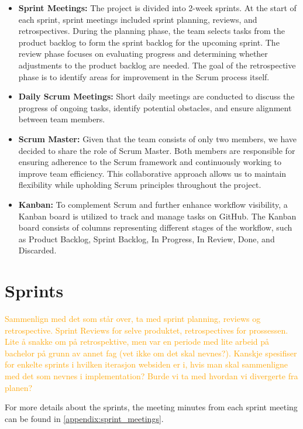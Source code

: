 \begin{itemize}
    \item \textbf{Sprint Meetings:} The project is divided into 2-week sprints. At the start of each sprint, sprint meetings included sprint planning, reviews, and retrospectives. During the planning phase, the team selects tasks from the product backlog to form the sprint backlog for the upcoming sprint. The review phase focuses on evaluating progress and determining whether adjustments to the product backlog are needed. The goal of the retrospective phase is to identify areas for improvement in the Scrum process itself.
    \item \textbf{Daily Scrum Meetings:} Short daily meetings are conducted to discuss the progress of ongoing tasks, identify potential obstacles, and ensure alignment between team members. 
    \item \textbf{Scrum Master:} Given that the team consists of only two members, we have decided to share the role of Scrum Master. Both members are responsible for ensuring adherence to the Scrum framework and continuously working to improve team efficiency. This collaborative approach allows us to maintain flexibility while upholding Scrum principles throughout the project.
    \item \textbf{Kanban:} To complement Scrum and further enhance workflow visibility, a Kanban board is utilized to track and manage tasks on GitHub. The Kanban board consists of columns representing different stages of the workflow, such as Product Backlog, Sprint Backlog, In Progress, In Review, Done, and Discarded.
\end{itemize}

\section{Sprints}

\textcolor{orange}{Sammenlign med det som står over, ta med sprint planning, reviews og retrospective. Sprint Reviews for selve produktet, retrospectives for prossessen. Lite å snakke om på retrospektive, men var en periode med lite arbeid på bachelor på grunn av annet fag (vet ikke om det skal nevnes?). Kanskje spesifiser for enkelte sprints i hvilken iterasjon websiden er i, hvis man skal sammenligne med det som nevnes i implementation? Burde vi ta med hvordan vi divergerte fra planen?}

For more details about the sprints, the meeting minutes from each sprint meeting can be found in \autoref{appendix:sprint_meetings}.

